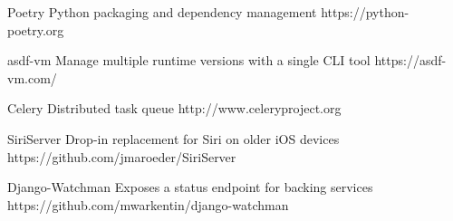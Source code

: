 \begin{cvhonors}


\cvhonor
{Poetry} %
{Python packaging and dependency management} %
{https://python-poetry.org} %


\cvhonor
{asdf-vm} %
{Manage multiple runtime versions with a single CLI tool} %
{https://asdf-vm.com/} %


\cvhonor
{Celery} %
{Distributed task queue} %
{http://www.celeryproject.org} %


\cvhonor
{SiriServer} %
{Drop-in replacement for Siri on older iOS devices} %
{https://github.com/jmaroeder/SiriServer} %


\cvhonor
{Django-Watchman} %
{Exposes a status endpoint for backing services} %
{https://github.com/mwarkentin/django-watchman} %


\end{cvhonors}